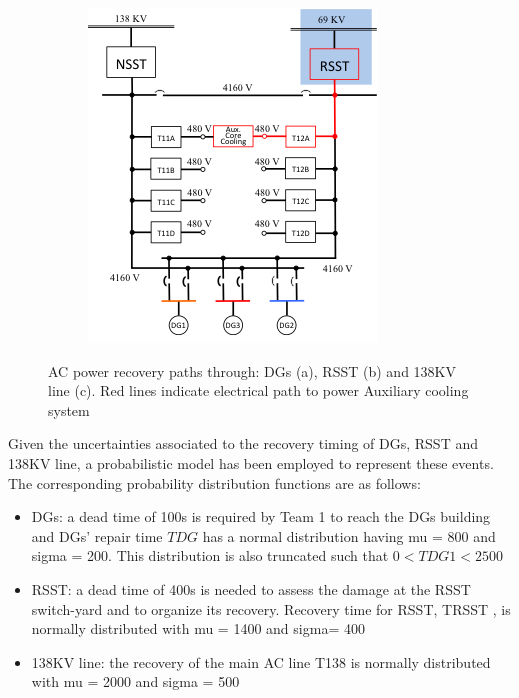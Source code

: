 \begin{figure}
\begin{subfigure}[b]{0.3\textwidth}
                \includegraphics[width=\textwidth]{figures/ACpowerRecPathRSST.png}
                \caption{}
                \label{fig:ACpowerRSST}
        \end{subfigure}
        \caption{AC power recovery paths through: DGs (a), RSST (b) and 138KV line (c). Red lines indicate electrical path to power Auxiliary cooling system}\label{fig:ACPowerRecovery}
\end{figure}

Given the uncertainties associated to the recovery timing of DGs, RSST and 138KV line, a probabilistic model has been employed to represent these events. The corresponding probability distribution functions are as follows:
\begin{itemize}
\item DGs: a dead time of 100s is required by Team 1 to reach the DGs building and DGs' repair time $TDG$ has a normal distribution having mu = 800 and sigma = 200. This distribution is also truncated such that $0 < TDG1 < 2500$
\item RSST: a dead time of 400s is needed to assess the damage at the RSST switch-yard and to organize its recovery. Recovery time for RSST, TRSST , is normally distributed with mu = 1400 and sigma= 400
\item 138KV line: the recovery of the main AC line T138 is normally distributed with mu = 2000 and sigma = 500
\end{itemize}

